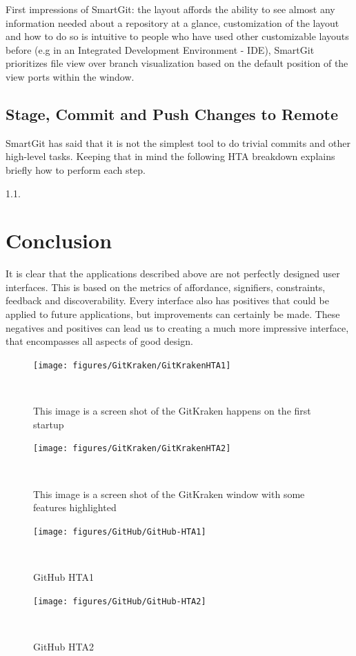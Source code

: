 \documentclass{sigchi}
\begin{document}
First impressions of SmartGit: the layout affords the ability to see almost any information needed about a repository at a glance,
customization of the layout and how to do so is intuitive to people who have used other customizable layouts before
(e.g in an Integrated Development Environment - IDE), SmartGit prioritizes file view over branch visualization based on the 
default position of the view ports within the window. 

\subsection{Stage, Commit and Push Changes to Remote}
SmartGit has said that it is not the simplest tool to do trivial commits and other high-level tasks.
Keeping that in mind the following HTA breakdown explains briefly how to perform each step.

1.1. 


\section{Conclusion}
It is clear that the applications described above are not perfectly designed
user interfaces. This is based on the metrics of affordance, signifiers, constraints, feedback and discoverability.
Every interface also has positives that could be applied to future applications, but improvements can certainly be made.
These negatives and positives can lead us to creating a much more impressive interface, that encompasses all 
aspects of good design.


\begin{figure}
  \centering
  \texttt{[image: figures/GitKraken/GitKrakenHTA1]}
  \caption{This image is a screen shot of the GitKraken happens on the first startup}~\label{fig:GitKrakenHTA1}
\end{figure}

\begin{figure}
  \centering
  \texttt{[image: figures/GitKraken/GitKrakenHTA2]}
  \caption{This image is a screen shot of the GitKraken window with some features highlighted}~\label{fig:GitKrakenHTA2}
\end{figure}

\begin{figure}
  \centering
  \texttt{[image: figures/GitHub/GitHub-HTA1]}
  \caption{GitHub HTA1}~\label{fig:GitHubHTA1}
\end{figure}

\begin{figure}
  \centering
  \texttt{[image: figures/GitHub/GitHub-HTA2]}
  \caption{GitHub HTA2}~\label{fig:GitHubHTA2}
\end{figure}

\balance{}



\end{document}
